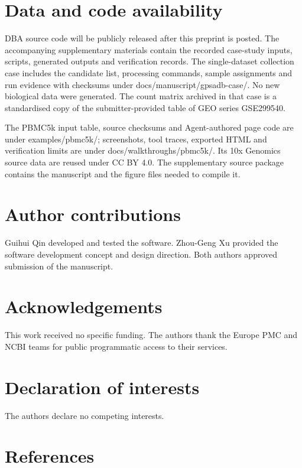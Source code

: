 \documentclass[11pt,a4paper]{article}
\begin{document}
\section{Data and code availability}\label{data-and-code-availability}

DBA source code will be publicly released after this preprint is posted.
The accompanying supplementary materials contain the recorded case-study
inputs, scripts, generated outputs and verification records. The
single-dataset collection case includes the candidate list, processing
commands, sample assignments and run evidence with checksums under
docs/manuscript/gpsadb-case/. No new biological data were generated. The
count matrix archived in that case is a standardised copy of the
submitter-provided table of GEO series GSE299540.

The PBMC5k input table, source checksums and Agent-authored page code are
under examples/pbmc5k/; screenshots, tool traces, exported HTML and
verification limits are under docs/walkthroughs/pbmc5k/. Its 10x Genomics
source data are reused under CC BY 4.0. The supplementary source package
contains the manuscript and the figure files needed to compile it.

\section{Author contributions}\label{author-contributions}

Guihui Qin developed and tested the software. Zhou-Geng Xu provided the
software development concept and design direction. Both authors approved
submission of the manuscript.

\section{Acknowledgements}\label{acknowledgements}

This work received no specific funding. The authors thank the Europe
PMC and NCBI teams for public programmatic access to their services.

\section{Declaration of interests}\label{declaration-of-interests}

The authors declare no competing interests.

\section{References}\label{references}
\end{document}
